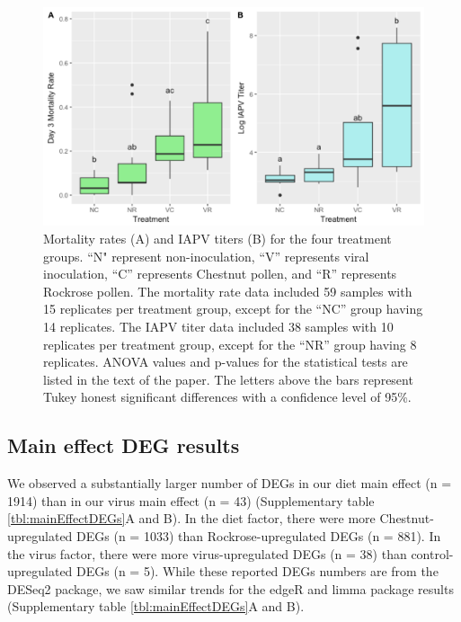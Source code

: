 \documentclass[11pt,a4paper,oldfontcommands,openany]{memoir}
\numberwithin{equation}{section} %
\begin{document}
\begin{figure}[H]
\centering
  \begin{framed}
  \includegraphics[width=\textwidth]{Images/mortality}
  \end{framed}
  \caption{Mortality rates (A) and IAPV titers (B) for the four treatment groups. ``N" represent non-inoculation, ``V'' represents viral inoculation, ``C'' represents Chestnut pollen, and ``R'' represents Rockrose pollen. The mortality rate data included 59 samples with 15 replicates per treatment group, except for the ``NC'' group having 14 replicates. The IAPV titer data included 38 samples with 10 replicates per treatment group, except for the ``NR'' group having 8 replicates. ANOVA values and p-values for the statistical tests are listed in the text of the paper. The letters above the bars represent Tukey honest significant differences with a confidence level of 95\%.}
  \label{fig:mortality}
\end{figure}

\subsection{Main effect DEG results}

We observed a substantially larger number of DEGs in our diet main effect (n = 1914) than in our virus main effect (n = 43) (Supplementary table \ref{tbl:mainEffectDEGs}A and B). In the diet factor, there were more Chestnut-upregulated DEGs (n = 1033) than Rockrose-upregulated DEGs (n = 881). In the virus factor, there were more virus-upregulated DEGs (n = 38) than control-upregulated DEGs (n = 5). While these reported DEGs numbers are from the DESeq2 package, we saw similar trends for the edgeR and limma package results (Supplementary table \ref{tbl:mainEffectDEGs}A and B).
\end{document}
